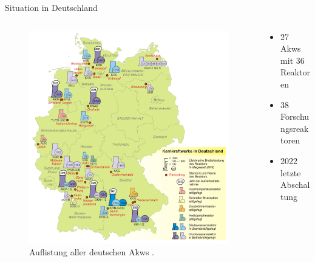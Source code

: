 \begin{frame}{ Situation in Deutschland }
  \begin{columns}

    \begin{column}{0.48\textwidth}
      \begin{figure}
        \centering
        \includegraphics[width=1\textwidth]{./bilder/Kernkraftwerke_in_Deutschland.png}
        \caption{ Auflistung aller deutschen Akws \cite{karte_abschaltungen}. }
        \label{ fig: karte_abschaltungen }
      \end{figure}
    \end{column}

    \begin{column}{0.48\textwidth}
      \begin{itemize}
        \setlength\itemsep{1.2em}
          \item{ 27 Akws mit 36 Reaktoren }
          \item{ 38 Forschungsreaktoren}
          \item{ 2022 letzte Abschaltung }
        \end{itemize}
    \end{column}
  \end{columns}
\end{frame}



